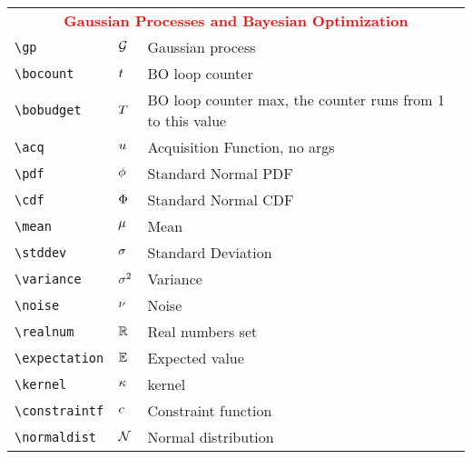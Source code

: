 \documentclass[]{article}
\begin{document}
\begin{table}
\begin{tabular}{lll}
		\midrule
		\multicolumn{3}{c}{\textbf{\textcolor{red}{Gaussian Processes and Bayesian Optimization}}}\\
		\verb!\gp!  & $\mathcal{G}$ & Gaussian process \\
		\verb!\bocount!  & $t$ & BO loop counter \\
		\verb!\bobudget!  & $T$ & BO loop counter max, the counter runs from 1 to this value \\
		\verb!\acq!  & $u$ & Acquisition Function, no args \\
		\verb!\pdf!  & $\phi$ & Standard Normal PDF \\
		\verb!\cdf!  & $\Phi$ & Standard Normal CDF \\
		\verb!\mean!  & $\mu$ & Mean \\
		\verb!\stddev!  & $\sigma$ & Standard Deviation \\
		\verb!\variance!  & $\sigma^2$ & Variance \\
		\verb!\noise!  & $\nu$ & Noise \\
		\verb!\realnum!  & $\mathbb{R}$ & Real numbers set \\
		\verb!\expectation!  & $\mathbb{E}$ & Expected value \\
		\verb!\kernel!  & $\kappa$ & kernel \\
		\verb!\constraintf!  & $c$ & Constraint function \\
		\verb!\normaldist!  & $\mathcal{N}$ & Normal distribution \\
		\bottomrule
\end{tabular}
\end{table}
\end{document}
